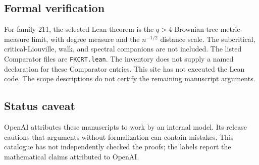 \documentclass[11pt]{article}
\begin{document}
\subsection{Formal verification}
For family 211, the selected Lean theorem is the $q>4$ Brownian tree metric-measure limit, with degree measure and the $n^{-1/2}$ distance scale. The subcritical, critical-Liouville, walk, and spectral companions are not included. The listed Comparator files are \texttt{FKCRT.lean}. The inventory does not supply a named declaration for these Comparator entries. This site has not executed the Lean code. The scope descriptions do not certify the remaining manuscript arguments.

\subsection{Status caveat}
OpenAI attributes these manuscripts to work by an internal model. Its release cautions that arguments without formalization can contain mistakes. This catalogue has not independently checked the proofs; the labels report the mathematical claims attributed to OpenAI.
\end{document}
